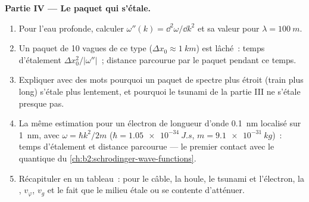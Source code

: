 \begin{problem}
\medskip
\noindent\textbf{Partie IV --- Le paquet qui s'étale.}
\begin{enumerate}[resume]
  \item Pour l'eau profonde, calculer $\omega''(k) = \dd^2\omega/\dd k^2$ et sa valeur
        pour $\lambda = \qty{100}{m}$.
  \item Un paquet de \qty{10}{} vagues de ce type ($\Delta x_0 \approx \qty{1}{km}$) est
        lâché~: temps d'étalement $\Delta x_0^2/|\omega''|$~; distance parcourue
        par le paquet pendant ce temps.
  \item Expliquer avec des mots pourquoi un paquet de spectre plus étroit
        (train plus long) s'étale plus lentement, et pourquoi le tsunami de la
        partie III ne s'étale presque pas.
  \item La même estimation pour un électron de longueur d'onde \qty{0.1}{nm}
        localisé sur \qty{1}{nm}, avec $\omega = \hbar k^2/2m$ ($\hbar =
        \qty{1.05e-34}{J.s}$, $m = \qty{9.1e-31}{kg}$)~: temps d'étalement et
        distance parcourue --- le premier contact avec le 
        quantique du \cref{ch:b2:schrodinger-wave-functions}.
  \item Récapituler en un tableau~: pour le câble, la houle, le tsunami et
        l'électron, la , $v_\varphi$, $v_g$ et
        le fait que le milieu étale ou se contente d'atténuer.
\end{enumerate}
\end{problem}
